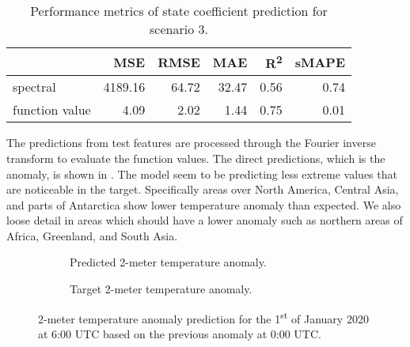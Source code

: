 \begin{table}[H]
  \caption{Performance metrics of state coefficient prediction for scenario 3.}\label{table:sc3_test_state_metrics}
  \centering
  \begin{tabular}{lrrrrr}
    \toprule
                   & MSE     & RMSE  & MAE   & R\textsuperscript{2} & sMAPE \\
    \midrule
    spectral       & 4189.16 & 64.72 & 32.47 & 0.56                 & 0.74  \\
    function value & 4.09    & 2.02  & 1.44  & 0.75                 & 0.01  \\
    \bottomrule
  \end{tabular}
\end{table}

The predictions from test features are processed through the Fourier inverse transform to evaluate the function values. The direct predictions, which is the anomaly, is shown in . The model seem to be predicting less extreme values that are noticeable in the target. Specifically areas over North America, Central Asia, and parts of Antarctica show lower temperature anomaly than expected. We also loose detail in areas which should have a lower anomaly such as northern areas of Africa, Greenland, and South Asia.
\begin{figure}[H]
  \centering
  \begin{subfigure}{\linewidth}
    \begin{adjustbox}{width=\linewidth}
      
    \end{adjustbox}
    \caption{Predicted 2-meter temperature anomaly.}\label{fig:sc3_anomaly_pred}
  \end{subfigure}
  \begin{subfigure}{\linewidth}
    \begin{adjustbox}{width=\linewidth}
      
    \end{adjustbox}
    \caption{Target 2-meter temperature anomaly.}\label{fig:sc3_anomaly_target}
  \end{subfigure}
  \caption{2-meter temperature anomaly prediction for the 1\textsuperscript{st} of January 2020 at 6:00 UTC based on the previous anomaly at 0:00 UTC.}\label{fig:sc3_anomaly_predictions}
\end{figure}

